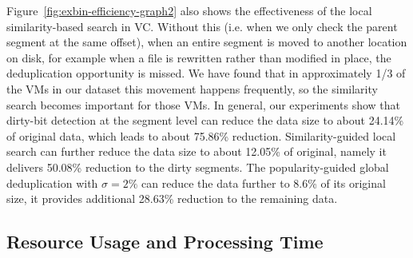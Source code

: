 Figure~\ref{fig:exbin-efficiency-graph2} also shows the effectiveness of the local similarity-based search in VC.
Without this (i.e. when we only check the parent segment at the same offset), when an entire
segment is moved to another location on disk, for example when a file is rewritten
rather than modified in place, the deduplication opportunity is missed. We have found that in
approximately 1/3 of the VMs in our dataset this movement happens frequently,
so the similarity search becomes important for those VMs.
In general, our experiments show that
dirty-bit detection at the segment level can reduce the data size to about 24.14\% of original data, 
which leads to about 75.86\% reduction.
Similarity-guided local search can further reduce the data size
to about 12.05\% of original, namely it delivers 50.08\% reduction to the dirty segments.
The popularity-guided global deduplication with $\sigma=2\% $
can reduce the data further to 8.6\% of its original size, 
it provides additional 28.63\% reduction to the remaining data.


\subsection{Resource Usage and Processing Time}


